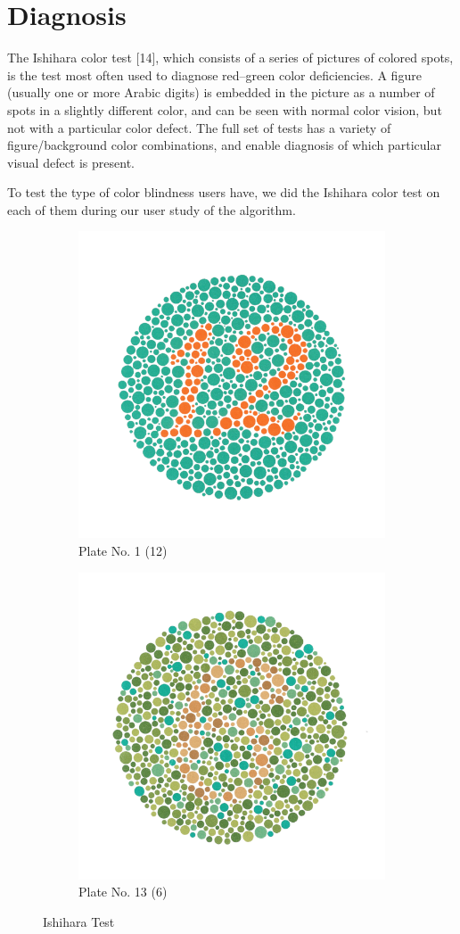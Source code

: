 \section{Diagnosis}
\label{Diagnosis}

The Ishihara color test [14], which consists of a series of pictures of colored spots, is the test most often used to diagnose red–green color deficiencies. A figure (usually one or more Arabic digits) is embedded in the picture as a number of spots in a slightly different color, and can be seen with normal color vision, but not with a particular color defect. The full set of tests has a variety of figure/background color combinations, and enable diagnosis of which particular visual defect is present.

To test the type of color blindness users have, we did the Ishihara color test on each of them during our user study of the algorithm.


\begin{figure}
\centering
\begin{subfigure}{.5\textwidth}
  \centering
  \includegraphics[width=.5\linewidth]{Ishihara1.PNG}
  \caption{Plate No. 1 (12)}
  \label{fig:sub1}
\end{subfigure}%
\begin{subfigure}{.5\textwidth}
  \centering
  \includegraphics[width=.5\linewidth]{Ishihara2.PNG}
  \caption{Plate No. 13 (6)}
  \label{fig:sub2}
\end{subfigure}
\caption{Ishihara Test}
\label{fig:test}
\end{figure}


